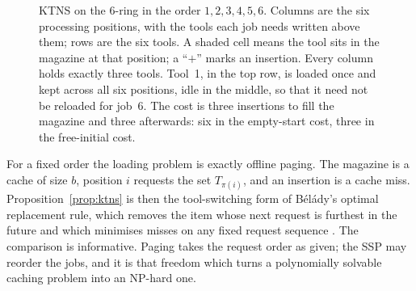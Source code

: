 \begin{figure}[t]\centering
{}
\caption{KTNS on the $6$-ring in the order $1,2,3,4,5,6$. Columns are the six
processing positions, with the tools each job needs written above them; rows are the
six tools. A shaded cell means the tool sits in the magazine at that position; a
``$+$'' marks an insertion. Every column holds exactly three tools. Tool~1, in the
top row, is loaded once and kept across all six positions, idle in the middle, so
that it need not be reloaded for job~6. The cost is three insertions to fill the
magazine and three afterwards: six in the empty-start cost, three in the
free-initial cost.}
\label{fig:ktns}
\end{figure}

\begin{remark}\label{rem:belady}
For a fixed order the loading problem is exactly offline paging. The magazine is a
cache of size $b$, position $i$ requests the set $T_{\pi(i)}$, and an insertion is a
cache miss. Proposition~\ref{prop:ktns} is then the tool-switching form of
B\'el\'ady's optimal replacement rule, which removes the item whose next request is
furthest in the future and which minimises misses on any fixed request sequence
\citep{Belady1966}. The comparison is informative. Paging takes the request order as
given; the SSP may reorder the jobs, and it is that freedom which turns a
polynomially solvable caching problem into an NP-hard one.
\end{remark}


